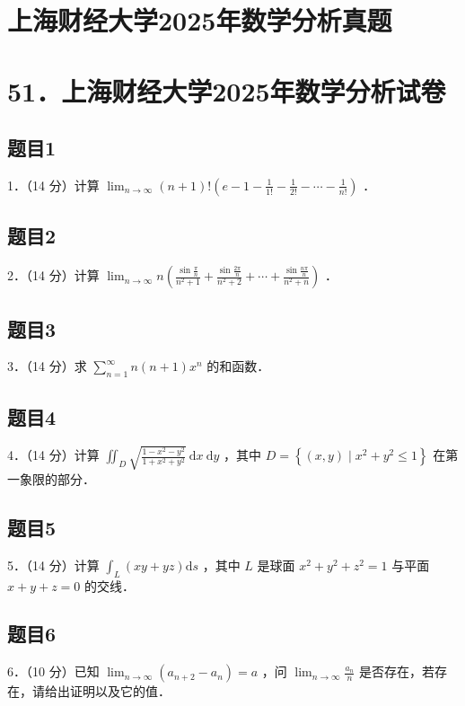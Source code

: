 \documentclass{article}
\begin{document}
\section*{上海财经大学2025年数学分析真题}
\section*{51．上海财经大学2025年数学分析试卷}

\subsection{题目1}
1．（14 分）计算 \(\lim _{n \rightarrow \infty}(n+1)!\left(e-1-\frac{1}{1!}-\frac{1}{2!}-\cdots-\frac{1}{n!}\right)\) ．

\subsection{题目2}
2．（14 分）计算 \(\lim _{n \rightarrow \infty} n\left(\frac{\sin \frac{\pi}{n}}{n^{2}+1}+\frac{\sin \frac{2 \pi}{n}}{n^{2}+2}+\cdots+\frac{\sin \frac{n \pi}{n}}{n^{2}+n}\right)\) ．

\subsection{题目3}
3．（14 分）求 \(\sum_{n=1}^{\infty} n(n+1) x^{n}\) 的和函数．

\subsection{题目4}
4．（14 分）计算 \(\iint_{D} \sqrt{\frac{1-x^{2}-y^{2}}{1+x^{2}+y^{2}}} \mathrm{~d} x \mathrm{~d} y\) ，其中 \(D=\left\{(x, y) \mid x^{2}+y^{2} \leq 1\right\}\) 在第一象限的部分．

\subsection{题目5}
5．（14 分）计算 \(\int_{L}(x y+y z) \mathrm{d} s\) ，其中 \(L\) 是球面 \(x^{2}+y^{2}+z^{2}=1\) 与平面 \(x+y+z=0\) 的交线．

\subsection{题目6}
6．（10 分）已知 \(\lim _{n \rightarrow \infty}\left(a_{n+2}-a_{n}\right)=a\) ，问 \(\lim _{n \rightarrow \infty} \frac{a_{n}}{n}\) 是否存在，若存在，请给出证明以及它的值．
\end{document}
